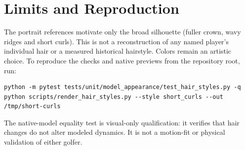 \documentclass[11pt]{article}
\begin{document}
\section{Limits and Reproduction}
The portrait references motivate only the broad silhouette (fuller crown,
wavy ridges and short curls). This is not a reconstruction of any named
player's individual hair or a measured historical hairstyle. Colors remain an
artistic choice. To reproduce the checks and native previews from the
repository root, run:
\begin{verbatim}
python -m pytest tests/unit/model_appearance/test_hair_styles.py -q
python scripts/render_hair_styles.py --style short_curls --out /tmp/short-curls
\end{verbatim}
The native-model equality test is visual-only qualification: it verifies that
hair changes do not alter modeled dynamics. It is not a motion-fit or physical
validation of either golfer.
\end{document}
